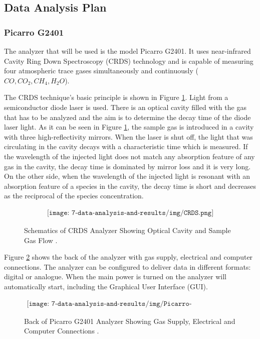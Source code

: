 \subsection{Data Analysis Plan}

\subsubsection{Picarro G2401}

The analyzer that will be used is the model Picarro G2401. It uses near-infrared Cavity Ring Down Spectroscopy (CRDS) technology and is capable of measuring four atmospheric trace gases simultaneously and continuously ($CO, CO_2, CH_4, H_2O$).

The CRDS technique's basic principle is shown in Figure \ref{fig:CRDS}. Light from a semiconductor diode laser is used. There is an optical cavity filled with the gas that has to be analyzed and the aim is to determine the decay time of the diode laser light. As it can be seen in Figure \ref{fig:CRDS}, the sample gas is introduced in a cavity with three high-reflectivity mirrors. When the laser is shut off, the light that was circulating in the cavity decays with a characteristic time which is measured. If the wavelength of the injected light does not match any absorption feature of any gas in the cavity, the decay time is dominated by mirror loss and it is very long. On the other side, when the wavelength of the injected light is resonant with an absorption feature of a species in the cavity, the decay time is short and decreases as the reciprocal of the species concentration.



\begin{figure}[H]
    \begin{align*}
        \texttt{[image: 7-data-analysis-and-results/img/CRDS.png]}
    \end{align*}
    \caption{Schematics of CRDS Analyzer Showing Optical Cavity and Sample Gas Flow \cite{Picarro}.\label{fig:CRDS}}
\end{figure}


Figure \ref{fig:Picarro-interfaces} shows the back of the analyzer with gas supply, electrical and computer connections. The analyzer can be configured to deliver data in different formats: digital or analogue. When the main power is turned on the analyzer will automatically start, including the Graphical User Interface (GUI). 

\begin{figure}[H]
    \begin{align*}
        \texttt{[image: 7-data-analysis-and-results/img/Picarro-interfaces.png]}
    \end{align*}
    \caption{Back of Picarro G2401 Analyzer Showing Gas Supply, Electrical and Computer Connections \cite{Picarrouserguide}.\label{fig:Picarro-interfaces}}
\end{figure}


